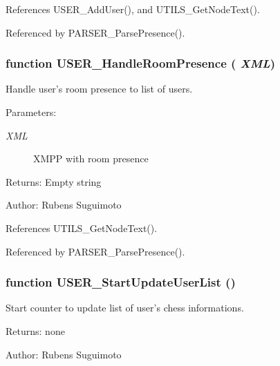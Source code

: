 References USER\_\-AddUser(), and UTILS\_\-GetNodeText().

Referenced by PARSER\_\-ParsePresence().
\subsubsection[USER\_\-HandleRoomPresence]{\setlength{\rightskip}{0pt plus 5cm}function USER\_\-HandleRoomPresence ( {\em XML})}\label{contact_2user_8js_79c97ea78a03cb57526fedbfd0f20fed}


Handle user's room presence to list of users. 

\begin{Desc}
\item[Parameters:]
\begin{description}
\item[{\em XML}]XMPP with room presence \end{description}
\end{Desc}
\begin{Desc}
\item[Returns:]Empty string \end{Desc}
\begin{Desc}
\item[Author:]Rubens Suguimoto \end{Desc}


References UTILS\_\-GetNodeText().

Referenced by PARSER\_\-ParsePresence().
\subsubsection[USER\_\-StartUpdateUserList]{\setlength{\rightskip}{0pt plus 5cm}function USER\_\-StartUpdateUserList ()}\label{contact_2user_8js_e9ccdfaccc75f8e28d7779f093c91dfb}


Start counter to update list of user's chess informations. 

\begin{Desc}
\item[Returns:]none \end{Desc}
\begin{Desc}
\item[Author:]Rubens Suguimoto \end{Desc}


